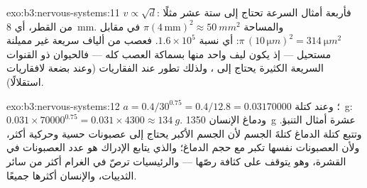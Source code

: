 \begin{solution}{exo:b3:nervous-systems:11}
$v \propto \sqrt{d}$: فأربعة أمثال السرعة تحتاج إلى ستة عشر
مثلًا من القطر، أي \qty{8}{mm}. والمساحة $\pi(4\,\text{mm})^{2} \approx \qty{50}{mm^2}$
في مقابل $\pi\,(10\,\unit{\micro m})^{2} = \qty{314}{\micro m^2}$: أي نسبة
$1.6\times 10^{5}$. فعصب من ألياف سريعة غير مميلنة مستحيل ---
إذ يكون ليف واحد منها بسماكة العصب كله --- فالحيوان ذو
القنوات السريعة الكثيرة يحتاج إلى ، ولذلك تطور عند
الفقاريات (وعند بضعة لافقاريات استقلالًا).
\end{solution}

\begin{solution}{exo:b3:nervous-systems:12}
$a = 0.4/30^{0.75} = 0.4/12.8 = 0.031$؛ وعند كتلة \qty{70000}{g}: $0.031\times
\num{70000}^{0.75} = 0.031\times 4300 \approx \qty{134}{g}$. ودماغ الإنسان
\qty{1350}{g} عشرة أمثال التنبؤ. وتتبع كتلة الدماغ كتلةَ
الجسم لأن الجسم الأكبر يحتاج إلى عصبونات حسية وحركية أكثر،
ولأن العصبونات نفسها تكبر مع حجم الدماغ؛ والذي يتابع
الإدراك هو عدد العصبونات في القشرة، وهو يتوقف على كثافة
رصّها --- والرئيسيات ترصّ في الغرام أكثر من سائر الثدييات،
والإنسان أكثرها جميعًا.
\end{solution}

